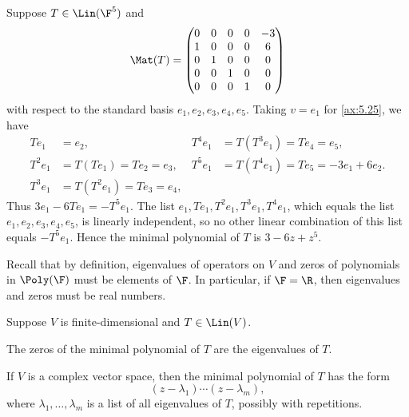 \begin{example}\label{ax:5.26}
Suppose $T\in\Lin(\F^5)$ and
\[ \Mat(T)=\begin{pmatrix}
  0 & 0 & 0 & 0 & -3\\
  1 & 0 & 0 & 0 & 6\\
  0 & 1 & 0 & 0 & 0\\
  0 & 0 & 1 & 0 & 0\\
  0 & 0 & 0 & 1 & 0
\end{pmatrix} \]
with respect to the standard basis $e_1,e_2,e_3,e_4,e_5$. Taking $v=e_1$ for
\ref{ax:5.25}, we have
\begin{align*}
Te_1 &= e_2, & T^4e_1 &= T(T^3e_1)=Te_4=e_5,\\
T^2e_1 &= T(Te_1)=Te_2=e_3, & T^5e_1 &= T(T^4e_1)=Te_5=-3e_1+6e_2.\\
T^3e_1 &= T(T^2e_1)=Te_3=e_4,
\end{align*}
Thus $3e_1-6Te_1=-T^5e_1$. The list $e_1,Te_1,T^2e_1,T^3e_1,T^4e_1$, which
equals the list $e_1,e_2,e_3,e_4,e_5$, is linearly independent, so no other
linear combination of this list equals $-T^5e_1$. Hence the minimal polynomial
of $T$ is $3-6z+z^5$.
\end{example}

Recall that by definition, eigenvalues of operators on $V$ and zeros of
polynomials in $\Poly(\F)$ must be elements of $\F$. In particular, if
$\F=\R$, then eigenvalues and zeros must be real numbers.

\begin{result}\label{ax:5.27}
Suppose $V$ is finite-dimensional and $T\in\Lin(V)$.
\begin{parts}
\item The zeros of the minimal polynomial of $T$ are the eigenvalues of $T$.
\item If $V$ is a complex vector space, then the minimal polynomial of $T$ has
  the form
  \[ (z-\lambda_1)\cdots(z-\lambda_m), \]
  where $\lambda_1,\dots,\lambda_m$ is a list of all eigenvalues of $T$,
  possibly with repetitions.
\end{parts}
\end{result}

